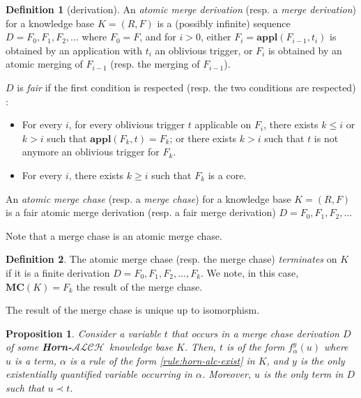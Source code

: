\documentclass{article}
\newtheorem{proposition}{Proposition}[section]
\theoremstyle{definition}
\newtheorem{definition}{Definition}[section]
\theoremstyle{remark}
\newcommand{\MC}{\textbf{MC}}
\newcommand{\Appl}{\textbf{appl}}
\newcommand{\ALCH}{\textbf{Horn-$\mathcal{ALCH}$}}
\begin{document}
\begin{definition}[derivation]
An \emph{atomic merge derivation} (resp. a \emph{merge derivation}) for a knowledge base $K = (R,F)$ is a (possibly infinite) sequence $D = F_0, F_1, F_2, \ldots$ where $F_0 = F$, and for $i >0$, either $F_{i}= \Appl(F_{i-1},t_i)$ is obtained by an application with $t_i$ an oblivious trigger, or $F_i$ is obtained by an atomic merging of $F_{i-1}$ (resp. the merging of $F_{i-1}$).

$D$ is \emph{fair} if the first condition is respected (resp. the two conditions are respected) : 
\begin{itemize}
\item For every $i$, for every oblivious trigger $t$ applicable on $F_i$, there exists $k \leq i$ or $k > i$ such that $\Appl(F_{k},t) = F_k$; or there exists $k > i$ such that $t$ is not anymore an oblivious trigger for $F_k$.
\item For every $i$, there exists $k \geq i$ such that $F_k$ is a core.
\end{itemize}

An \emph{atomic merge chase} (resp. a \emph{merge chase}) for a knowledge base $K= (R,F)$ is a fair atomic merge derivation (resp. a fair merge derivation) $D=F_0,F_1,F_2,\ldots$
\end{definition}

Note that a merge chase is an atomic merge chase.

\begin{definition}
The atomic merge chase (resp. the merge chase)  \emph{terminates} on $K$ if it is a finite derivation $D=F_0,F_1,F_2,\ldots,F_k$. We note, in this case, $\MC(K) = F_k$ the result of the merge chase.
\end{definition}

The result of the merge chase is unique up to isomorphism.


 
\begin{proposition} \label{prec}
Consider a variable $t$ that occurs in a merge chase derivation $D$ of some \ALCH\ knowledge base $K$.
Then, $t$ is of the form $f^y_\alpha(u)$ where $u$ is a term, $\alpha$ is a rule of the form \ref{rule:horn-alc-exist} in $K$, and $y$ is the only existentially quantified variable occurring in $\alpha$.
Moreover, $u$ is the only term in $D$ such that $u \prec t$.
\end{proposition}
\end{document}
